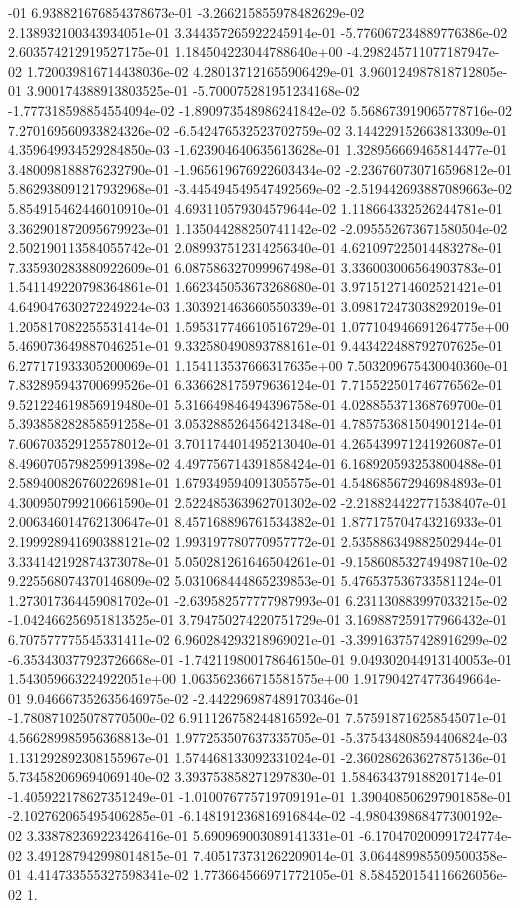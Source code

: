 -01	6.938821676854378673e-01	-3.266215855978482629e-02	2.138932100343934051e-01	3.344357265922245914e-01	-5.776067234889776386e-02	2.603574212919527175e-01	1.184504223044788640e+00	-4.298245711077187947e-02	1.720039816714438036e-02	4.280137121655906429e-01	3.960124987818712805e-01	3.900174388913803525e-01	-5.700075281951234168e-02	-1.777318598854554094e-02	-1.890973548986241842e-02	5.568673919065778716e-02	7.270169560933824326e-02	-6.542476532523702759e-02	3.144229152663813309e-01	4.359649934529284850e-03	-1.623904640635613628e-01	1.328956669465814477e-01	3.480098188876232790e-01	-1.965619676922603434e-02	-2.236760730716596812e-01	5.862938091217932968e-01	-3.445494549547492569e-02	-2.519442693887089663e-02	5.854915462446010910e-01	4.693110579304579644e-02	1.118664332526244781e-01	3.362901872095679923e-01	1.135044288250741142e-02	-2.095552673671580504e-02	2.502190113584055742e-01	2.089937512314256340e-01	4.621097225014483278e-01	7.335930283880922609e-01	6.087586327099967498e-01	3.336003006564903783e-01	1.541149220798364861e-01	1.662345053673268680e-01	3.971512714602521421e-01	4.649047630272249224e-03	1.303921463660550339e-01	3.098172473038292019e-01	1.205817082255531414e-01	1.595317746610516729e-01	1.077104946691264775e+00	5.469073649887046251e-01	9.332580490893788161e-01	9.443422488792707625e-01	6.277171933305200069e-01	1.154113537666317635e+00	7.503209675430040360e-01	7.832895943700699526e-01	6.336628175979636124e-01	7.715522501746776562e-01	9.521224619856919480e-01	5.316649846494396758e-01	4.028855371368769700e-01	5.393858282858591258e-01	3.053288526456421348e-01	4.785753681504901214e-01	7.606703529125578012e-01	3.701174401495213040e-01	4.265439971241926087e-01	8.496070579825991398e-02	4.497756714391858424e-01	6.168920593253800488e-01	2.589400826760226981e-01	1.679349594091305575e-01	4.548685672946984893e-01	4.300950799210661590e-01	2.522485363962701302e-02	-2.218824422771538407e-01	2.006346014762130647e-01	8.457168896761534382e-01	1.877175704743216933e-01	2.199928941690388121e-02	1.993197780770957772e-01	2.535886349882502944e-01	3.334142192874373078e-01	5.050281261646504261e-01	-9.158608532749498710e-02	9.225568074370146809e-02	5.031068444865239853e-01	5.476537536733581124e-01	1.273017364459081702e-01	-2.639582577777987993e-01	6.231130883997033215e-02	-1.042466256951813525e-01	3.794750274220751729e-01	3.169887259177966432e-01	6.707577775545331411e-02	6.960284293218969021e-01	-3.399163757428916299e-02	-6.353430377923726668e-01	-1.742119800178646150e-01	9.049302044913140053e-01	1.543059663224922051e+00	1.063562366715581575e+00	1.917904274773649664e-01	9.046667352635646975e-02	-2.442296987489170346e-01	-1.780871025078770500e-02	6.911126758244816592e-01	7.575918716258545071e-01	4.566289985956368813e-01	1.977253507637335705e-01	-5.375434808594406824e-03	1.131292892308155967e-01	1.574468133092331024e-01	-2.360286263627875136e-01	5.734582069694069140e-02	3.393753858271297830e-01	1.584634379188201714e-01	-1.405922178627351249e-01	-1.010076775719709191e-01	1.390408506297901858e-01	-2.102762065495406285e-01	-6.148191236816916844e-02	-4.980439868477300192e-02	3.338782369223426416e-01	5.690969003089141331e-01	-6.170470200991724774e-02	3.491287942998014815e-01	7.405173731262209014e-01	3.064489985509500358e-01	4.414733555327598341e-02	1.773664566971772105e-01	8.584520154116626056e-02	1.